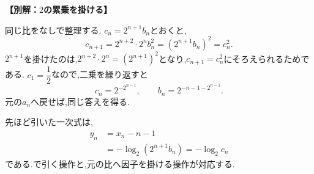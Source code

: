 \begin{enumerate}[label=\textbf{問\arabic*.},leftmargin=3.8em,format=\bookitemlink{practice-advanced}{solution}{problem}]
                \par\smallskip\noindent\textbf{【別解：$2$の累乗を掛ける】}\par\nopagebreak[4]
                同じ比をなしで整理する.
                $c_n=2^{n+1}b_n$とおくと,
                \[
                  c_{n+1}=2^{n+2}\cdot2^n b_n^2
                           =(2^{n+1}b_n)^2=c_n^2.
                \]
                $2^{n+1}$を掛けたのは,$2^{n+2}\cdot2^n=(2^{n+1})^2$となり,$c_{n+1}=c_n^2$にそろえられるためである.
                $c_1=\dfrac{1}{2}$なので,二乗を繰り返すと
                \[
                  c_n=2^{-2^{n-1}},\qquad
                  b_n=2^{-n-1-2^{n-1}}.
                \]
                元の$a_n$へ戻せば,同じ答えを得る.
                \par\smallskip
                先ほど引いた一次式は,
                \begin{align*}
                  y_n&=x_n-n-1\\
                     &=-\log_2(2^{n+1}b_n)=-\log_2c_n
                \end{align*}
                である.で引く操作と,元の比へ因子を掛ける操作が対応する.
        \end{enumerate}
